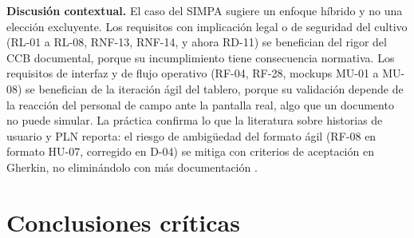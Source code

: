 \documentclass[11pt,a4paper]{article}
\begin{document}
\noindent\textbf{Discusión contextual.} El caso del SIMPA sugiere un enfoque híbrido y no una
elección excluyente. Los requisitos con implicación legal o de seguridad del cultivo (RL-01 a
RL-08, RNF-13, RNF-14, y ahora RD-11) se benefician del rigor del CCB documental, porque su
incumplimiento tiene consecuencia normativa. Los requisitos de interfaz y de flujo operativo
(RF-04, RF-28, mockups MU-01 a MU-08) se benefician de la iteración ágil del tablero, porque su
validación depende de la reacción del personal de campo ante la pantalla real, algo que un
documento no puede simular. La práctica confirma lo que la literatura sobre historias de usuario y
PLN reporta: el riesgo de ambigüedad del formato ágil (RF-08 en formato HU-07, corregido en D-04)
se mitiga con criterios de aceptación en Gherkin, no eliminándolo con más documentación
\cite{raharjana2021}.

\section{Conclusiones críticas}
\end{document}
